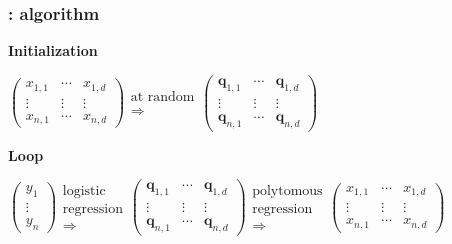 \documentclass[english,xcolor={rgb,dvipsnames,table,usenames}, presentation]{beamer}
\newcommand\q{{\bm{q}}}
\begin{document}
\begin{frame}
\frametitle{\secname: algorithm}

\tiny


\textbf{Initialization}


\medskip

$\left( \begin{array}{ccc}
x_{1,1} & \cdots & x_{1,d}  \\
 \vdots & \vdots & \vdots \\
 x_{n,1} & \cdots & x_{n,d} \end{array} \right)
\begin{array}{c}
\text{at random} \\
\Rightarrow \end{array}
\left( \begin{array}{ccc}
\q_{1,1} & \cdots & \q_{1,d}  \\
 \vdots & \vdots & \vdots \\
 \q_{n,1} & \cdots & \q_{n,d} \end{array} \right)$

\medskip

\textbf{Loop}

\medskip

$\left( \begin{array}{c}
y_1 \\
\vdots \\
y_n \end{array} \right)
\begin{array}{c}
\text{logistic} \\
\text{regression} \\
\Rightarrow \end{array}
\left( \begin{array}{ccc}
\q_{1,1} & \cdots & \q_{1,d}  \\
 \vdots & \vdots & \vdots \\
 \q_{n,1} & \cdots & \q_{n,d} \end{array} \right)
\begin{array}{c}
\text{polytomous} \\
\text{regression} \\
\Rightarrow \end{array}
\left( \begin{array}{ccc}
x_{1,1} & \cdots & x_{1,d}  \\
 \vdots & \vdots & \vdots \\
 x_{n,1} & \cdots & x_{n,d} \end{array} \right)
$


\end{frame}
\end{document}
